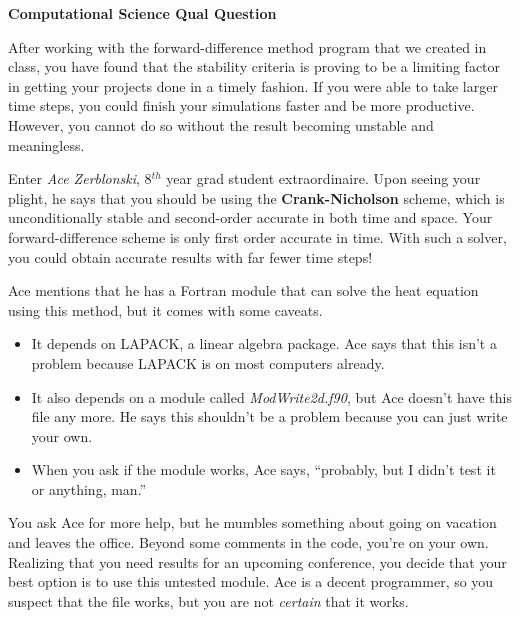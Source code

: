 \documentclass[12pt, letterpaper]{article}
\begin{document}
\begin{center}
  {\LARGE \textbf{Computational Science Qual Question}}\\
\end{center}

After working with the forward-difference method program that we created
in class, you have found that the stability criteria is proving to be a
limiting factor in getting your projects done in a timely fashion.  If you
were able to take larger time steps, you could finish your simulations faster
and be more productive.  However, you cannot do so without the result
becoming unstable and meaningless.

Enter \emph{Ace Zerblonski}, 8$^{th}$ year grad student extraordinaire.  Upon
seeing your plight, he says that you should be using the 
\textbf{Crank-Nicholson} scheme, which is unconditionally stable and 
second-order accurate in both time and space.  Your forward-difference scheme
is only first order accurate in time.  With such a solver, you could obtain
accurate results with far fewer time steps!

Ace mentions that he has a Fortran module that can solve the heat equation
using this method, but it comes with some caveats.
\begin{itemize}
  \item It depends on LAPACK, a linear algebra package.  Ace says that this
    isn't a problem because LAPACK is on most computers already.
  \item It also depends on a module called \textit{ModWrite2d.f90}, but
    Ace doesn't have this file any more.  He says this shouldn't be a problem
    because you can just write your own.
  \item When you ask if the module works, Ace says, ``probably, but I didn't
    test it or anything, man.''  
\end{itemize}

You ask Ace for more help, but he mumbles something about going on vacation
and leaves the office.  
Beyond some comments in the code, you're on your own.
Realizing that you need results for an upcoming
conference, you decide that your best option is to use this untested 
module.  Ace is a decent programmer, so you suspect that the file works, but
you are not \emph{certain} that it works.  
\end{document}
